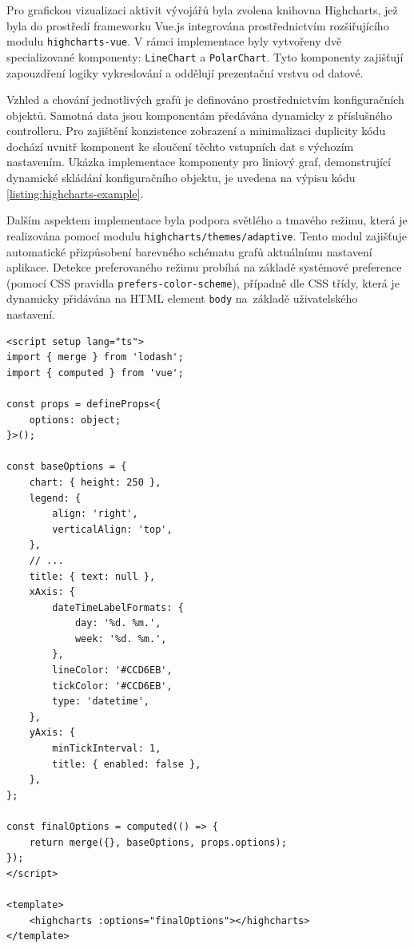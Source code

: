 Pro grafickou vizualizaci aktivit vývojářů byla zvolena knihovna Highcharts, jež byla do prostředí frameworku Vue.js integrována prostřednictvím rozšiřujícího modulu \texttt{highcharts-vue}. V rámci implementace byly vytvořeny dvě specializované komponenty: \texttt{LineChart} a \texttt{PolarChart}. Tyto komponenty zajišťují zapouzdření logiky vykreslování a oddělují prezentační vrstvu od datové.

Vzhled a chování jednotlivých grafů je definováno prostřednictvím konfiguračních objektů. Samotná data jsou komponentám předávána dynamicky z příslušného controlleru. Pro zajištění konzistence zobrazení a minimalizaci duplicity kódu dochází uvnitř komponent ke sloučení těchto vstupních dat s výchozím nastavením. Ukázka implementace komponenty pro liniový graf, demonstrující dynamické skládání konfiguračního objektu, je uvedena na výpisu kódu \ref{listing:highcharts-example}.

Dalším aspektem implementace byla podpora světlého a tmavého režimu, která je realizována pomocí modulu \texttt{highcharts/themes/adaptive}. Tento modul zajišťuje automatické přizpůsobení barevného schématu grafů aktuálnímu nastavení aplikace. Detekce preferovaného režimu probíhá na základě systémové preference (pomocí CSS pravidla \texttt{prefers-color-scheme}), případně dle CSS třídy, která je dynamicky přidávána na HTML element \texttt{body} na~základě uživatelského nastavení.

\begin{listing}[h!]
    \caption{Vue.js komponenta s konfigurací grafu}\label{listing:highcharts-example}
    \begin{verbatim}
<script setup lang="ts">
import { merge } from 'lodash';
import { computed } from 'vue';

const props = defineProps<{
    options: object;
}>();

const baseOptions = {
    chart: { height: 250 },
    legend: {
        align: 'right',
        verticalAlign: 'top',
    },
    // ...
    title: { text: null },
    xAxis: {
        dateTimeLabelFormats: {
            day: '%d. %m.',
            week: '%d. %m.',
        },
        lineColor: '#CCD6EB',
        tickColor: '#CCD6EB',
        type: 'datetime',
    },
    yAxis: {
        minTickInterval: 1,
        title: { enabled: false },
    },
};

const finalOptions = computed(() => {
    return merge({}, baseOptions, props.options);
});
</script>

<template>
    <highcharts :options="finalOptions"></highcharts>
</template>
    \end{verbatim}
\end{listing}
